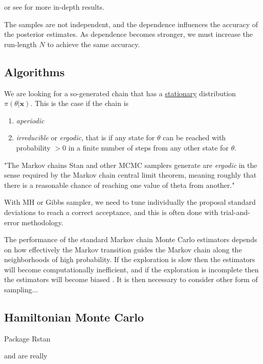 or see \citet[section 2.2.3]{angelino_patterns_2016} for more in-depth results.

The samples are not independent, and the dependence influences the accuracy of the posterior estimates. As dependence becomes stronger, we must increase the run-length $N$ to achieve the same accuracy. 


\subsection{Algorithms} 

We are looking for a so-generated chain that has a \underline{stationary} distribution $\pi(\theta|\boldsymbol{x})$. This is the case if the chain is 

\begin{enumerate}
	\item \emph{aperiodic}
	\item \emph{irreducible} or \emph{ergodic}, that is if any state for $\theta$ can be reached with probability $>0$ in a finite number of steps from any other state for $\theta$.
\end{enumerate}

"The Markov chains Stan and other MCMC samplers generate are \emph{ergodic} in the
sense required by the Markov chain central limit theorem, meaning roughly that there
is a reasonable chance of reaching one value of theta from another." \cite{stan_stan_2016}

With MH or Gibbs sampler, we need to tune individually the proposal standard deviations to reach a correct acceptance, and this is often done with trial-and-error methodology. 



The  performance  of  the standard  Markov  chain  Monte  Carlo  estimators  depends  on  how  effectively the Markov transition guides the Markov chain along the neighborhoods of high probability.  If  the  exploration  is  slow  then  the  estimators  will  become  computationally inefficient,  and  if  the  exploration  is  incomplete  then  the  estimators  will  become  biased
\citet{betancourt_diagnosing_2016}. It is then necessary to consider other form of sampling...


\subsection{Hamiltonian Monte Carlo}

Package Rstan

\cite{neal_mcmc_2011} and \cite{betancourt_hamiltonian_2015} are really 


